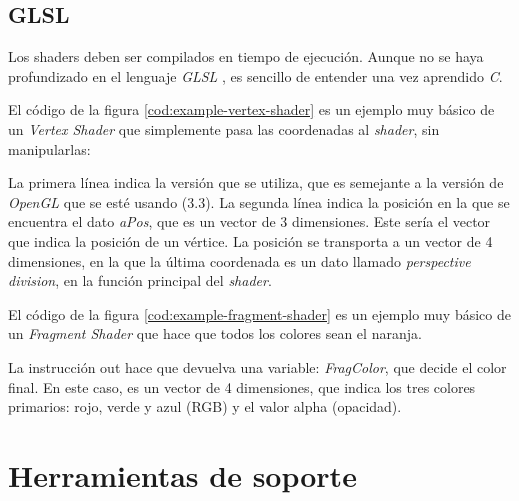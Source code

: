

\subsection{GLSL} \label{sub:glsl}

Los shaders deben ser compilados en tiempo de ejecución. Aunque no  se haya profundizado en el lenguaje \textit{GLSL} \cite{webGLSLDocs}, es sencillo de entender una vez aprendido \textit{C}.

El código de la figura \ref{cod:example-vertex-shader} es un ejemplo muy básico de un \textit{Vertex Shader} que simplemente pasa las coordenadas al \textit{shader}, sin manipularlas:


La primera línea indica la versión que se utiliza, que es semejante a la versión de \textit{OpenGL} que se esté usando (3.3). La segunda línea indica la posición en la que se encuentra el dato \textit{aPos}, que es un vector de 3 dimensiones. Este sería el vector que indica la posición de un vértice. La posición se transporta a un vector de 4 dimensiones, en la que la última coordenada es un dato llamado \textit{perspective division}, en la función principal del \textit{shader}.

\FloatBarrier

El código de la figura \ref{cod:example-fragment-shader} es un ejemplo muy básico de un \textit{Fragment Shader} que hace que todos los colores sean el naranja.



La instrucción out hace que devuelva una variable: \textit{FragColor}, que decide el color final. En este caso, es un vector de 4 dimensiones, que indica los tres colores primarios: rojo, verde y azul (RGB) y el valor alpha (opacidad).

\FloatBarrier
\section{Herramientas de soporte} \label{sec:support-technologies}

